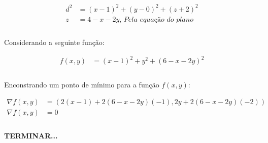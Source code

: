 \documentclass{article}
\begin{document}
            \begin{align*}
                d^2 &= (x - 1)^2 + (y - 0)^2 + (z + 2)^2\\
                z &= 4 - x - 2y \textit{, Pela equação do plano}\\
            \end{align*}

            \paragraph{}
            Considerando a seguinte função:

            \begin{align*}
                f(x, y) &= (x - 1)^2 + y^2 + (6 -x -2y)^2\\
            \end{align*}

            \paragraph{}
            Enconstrando um ponto de mínimo para a função $f(x, y)$:

            \begin{align*}
                \nabla f(x, y) &= \left(2(x - 1) + 2(6 - x - 2y)(-1), 2y + 2(6 - x - 2y)(-2)\right)\\
                \nabla f(x, y) &= 0\\
            \end{align*}

            \paragraph{}
            \textbf{TERMINAR...}
\end{document}
